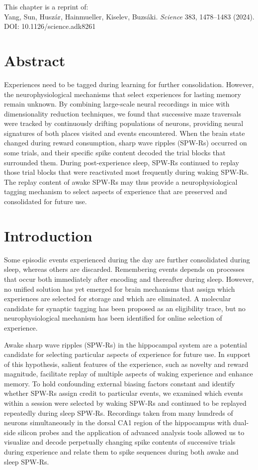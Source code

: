 This chapter is a reprint of: \\
Yang, Sun, Husz\'{a}r, Hainmueller, Kiselev, Buzs\'{a}ki. \textit{Science} 383, 1478--1483 (2024). \\
DOI: 10.1126/science.adk8261

\section*{Abstract}

Experiences need to be tagged during learning for further consolidation. However, the neurophysiological mechanisms that select experiences for lasting memory remain unknown. By combining large-scale neural recordings in mice with dimensionality reduction techniques, we found that successive maze traversals were tracked by continuously drifting populations of neurons, providing neural signatures of both places visited and events encountered. When the brain state changed during reward consumption, sharp wave ripples (SPW-Rs) occurred on some trials, and their specific spike content decoded the trial blocks that surrounded them. During post-experience sleep, SPW-Rs continued to replay those trial blocks that were reactivated most frequently during waking SPW-Rs. The replay content of awake SPW-Rs may thus provide a neurophysiological tagging mechanism to select aspects of experience that are preserved and consolidated for future use.

\section{Introduction}

Some episodic events experienced during the day are further consolidated during sleep, whereas others are discarded. Remembering events depends on processes that occur both immediately after encoding and thereafter during sleep. However, no unified solution has yet emerged for brain mechanisms that assign which experiences are selected for storage and which are eliminated. A molecular candidate for synaptic tagging has been proposed as an eligibility trace, but no neurophysiological mechanism has been identified for online selection of experience.

Awake sharp wave ripples (SPW-Rs) in the hippocampal system are a potential candidate for selecting particular aspects of experience for future use. In support of this hypothesis, salient features of the experience, such as novelty and reward magnitude, facilitate replay of multiple aspects of waking experience and enhance memory. To hold confounding external biasing factors constant and identify whether SPW-Rs assign credit to particular events, we examined which events within a session were selected by waking SPW-Rs and continued to be replayed repeatedly during sleep SPW-Rs. Recordings taken from many hundreds of neurons simultaneously in the dorsal CA1 region of the hippocampus with dual-side silicon probes and the application of advanced analysis tools allowed us to visualize and decode perpetually changing spike contents of successive trials during experience and relate them to spike sequences during both awake and sleep SPW-Rs.


